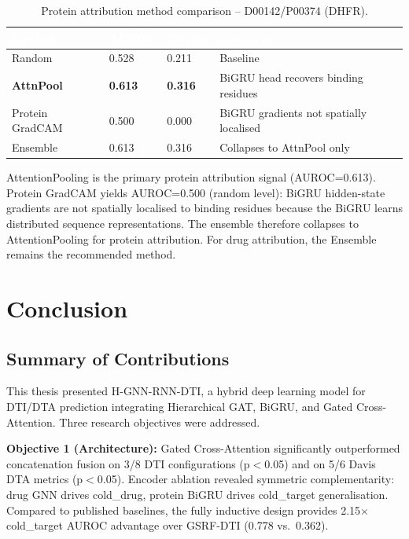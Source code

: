 \documentclass[12pt,a4paper,oneside]{report}
\newcommand{\sig}[1]{\textbf{#1}}
\begin{document}
\begin{table}[htbp]
\centering
\caption{Protein attribution method comparison -- D00142/P00374 (DHFR).}
\label{tab:prot-compare}
\begin{tabular}{@{}L{3cm}C{2.0cm}C{2.0cm}L{4cm}@{}}
\toprule
{}
\textcolor{white}{\textbf{Method}} &
\textcolor{white}{\textbf{AUROC}} &
\textcolor{white}{\textbf{P@10\%}} &
\textcolor{white}{\textbf{Comment}} \\
\midrule
{}
Random         & 0.528 & 0.211 & Baseline \\
\sig{AttnPool} & \sig{0.613} & \sig{0.316} & BiGRU head recovers binding residues \\
Protein GradCAM& 0.500 & 0.000 & BiGRU gradients not spatially localised \\
Ensemble       & 0.613 & 0.316 & Collapses to AttnPool only \\
\bottomrule
\end{tabular}
\end{table}

AttentionPooling is the primary protein attribution signal (AUROC=0.613). Protein GradCAM yields AUROC=0.500 (random level): BiGRU hidden-state gradients are not spatially localised to binding residues because the BiGRU learns distributed sequence representations. The ensemble therefore collapses to AttentionPooling for protein attribution. For drug attribution, the Ensemble remains the recommended method.

\chapter{Conclusion}

\section{Summary of Contributions}

This thesis presented H-GNN-RNN-DTI, a hybrid deep learning model for DTI/DTA prediction integrating Hierarchical GAT, BiGRU, and Gated Cross-Attention. Three research objectives were addressed.

\textbf{Objective 1 (Architecture):} Gated Cross-Attention significantly outperformed concatenation fusion on 3/8 DTI configurations (p${<}$0.05) and on 5/6 Davis DTA metrics (p${<}$0.05). Encoder ablation revealed symmetric complementarity: drug GNN drives cold\_drug, protein BiGRU drives cold\_target generalisation. Compared to published baselines, the fully inductive design provides 2.15$\times$ cold\_target AUROC advantage over GSRF-DTI (0.778 vs.\ 0.362).
\end{document}
